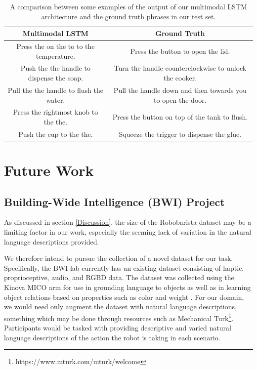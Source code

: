 \documentclass[letterpaper, 12 pt, conference]{ieeeconf}
\begin{document}
\begin{table}[t]
\center
\begin{tabular}{|c|c|}
\hline
\textbf{Multimodal LSTM} & \textbf{Ground Truth} \\
\hline
Press the on the to to the temperature. & Press the button to open the lid. \\
\hline
Push the the handle to dispense the soap. & Turn the handle counterclockwise to unlock the
cooker. \\
\hline
Pull the the handle to flush the water. & Pull the handle down and then towards you to
open the door. \\
\hline
Press the rightmost knob to the the. & Press the button on top of the tank to flush. \\
\hline
Push the cup to the the. & Squeeze the trigger to dispense the glue. \\
\hline
\end{tabular}
\caption{A comparison between some examples of the output of our multimodal LSTM architecture and the ground truth phrases in our test set.}\label{fig:LSTM_examples}
\end{table}

\section{Future Work}\label{Future Work}

\subsection{Building-Wide Intelligence (BWI) Project}

As discussed in section \ref{Discussion}, the size of the Robobarista dataset may be a limiting factor in our work, especially the seeming lack of variation in the natural language descriptions provided. 

We therefore intend to pursue the collection of a novel dataset for our task. Specifically, the BWI lab currently has an existing dataset consisting of haptic, proprioceptive, audio, and RGBD data. The dataset was collected using the Kinova MICO arm for use in grounding language to objects as well as in learning object relations based on properties such as color and weight \cite{thomason20161,sinapov2016learning}. For our domain, we would need only augment the dataset with natural language descriptions, something which may be done through resources such as Mechanical Turk\footnote{https://www.mturk.com/mturk/welcome}. Participants would be tasked with providing descriptive and varied natural language descriptions of the action the robot is taking in each scenario.
\end{document}
